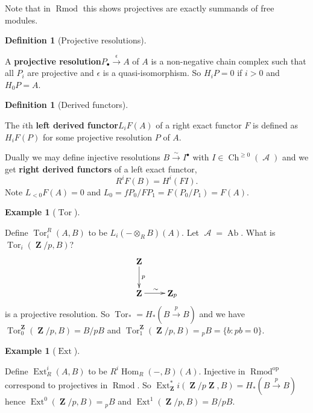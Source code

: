 \documentclass[10pt,]{book}
\newcommand{\lt}{<}
\newcommand{\gt}{>}
\newcommand{\terminology}[1]{\textbf{#1}}
\theoremstyle{plain}
\theoremstyle{definition}
\newtheorem{definition}[theorem]{Definition}
\newtheorem{example}[theorem]{Example}
\numberwithin{equation}{section}
\DeclareMathOperator{\Hom}{Hom}
\DeclareMathOperator{\Tor}{Tor}
\DeclareMathOperator{\Ext}{Ext}
\DeclareMathOperator{\op}{op}
\DeclareMathOperator{\Ch}{Ch}
\DeclareMathOperator{\Ab}{\text{Ab}}
\DeclareMathOperator{\Rmod}{R\text{mod}}
\DeclareMathOperator{\cA}{\mathcal{A}}
\DeclareMathOperator{\ZZ}{\mathbf{Z}}
\begin{document}
\par

          Note that in \(\Rmod\) this shows projectives are exactly summands of free modules.
          
\begin{definition}[Projective resolutions]\label{definition-18}

            A \terminology{projective resolution}\(P_\bullet \xrightarrow{\epsilon} A\) of \(A\) is a non-negative chain complex such that all \(P_i\) are projective and \(\epsilon\) is a quasi-isomorphism.
            So \(H_i P = 0\) if \(i \gt 0\) and \(H_0 P = A\).
          \end{definition}
\begin{definition}[Derived functors]\label{definition-19}

            The \(i\)th \terminology{left derived functor}\(L_i F(A)\) of a right exact functor \(F\) is defined as \(H_iF(P)\) for some projective resolution \(P\) of \(A\).\newline{}\end{definition}
\par

          Dually we may define injective resolutions \(B \xrightarrow{\sim} I^\bullet\) with \(I \in \Ch^{\ge 0}(\cA)\) and we get \terminology{right derived functors} of a left exact functor,
          \[
            R^i F(B) = H^i (FI ).
          \]
          Note \(L_{\lt 0} F(A) = 0\) and \(L_0= fP_0 / FP_1 = F(P_0/P_1) = F(A)\).
\begin{example}[\(\Tor\)]\label{example-10}

            Define \(\Tor^R_i(A, B)\) to be \(L_i(- \otimes_R B)(A)\).
            Let \(\cA = \Ab\). What is \(\Tor_i(\ZZ/p , B)\)?
            \[
              \xymatrix{\ZZ\ar[d]^p &\\ \ZZ \ar[r]^{\sim} &\ZZ_p}
            \]
            is a projective resolution.
            So \(\Tor_* = H_*(B \xrightarrow{p} B)\) and we have \(\Tor^{\ZZ}_0 (\ZZ/p, B) = B/pB\) and \(\Tor^{\ZZ}_1(\ZZ/p, B) = {}_pB = \{b : pb = 0\}\).
          \end{example}
\begin{example}[\(\Ext\)]\label{example-11}

            Define \(\Ext^i_R(A, B)\) to be \(R^i\Hom_R(-, B)(A)\).
            Injective in \(\Rmod^{\op}\) correspond to projectives in \(\Rmod\).
            So \(\Ext_{\ZZ}^*i(\ZZ/p\ZZ, B) = H_*(B \xrightarrow{p} B)\) hence \(\Ext^0 (\ZZ/p, B) = {}_pB\) and \(\Ext^1(\ZZ/p, B) = B/pB\).
          \end{example}
\typeout{************************************************}
\typeout{************************************************}
\end{document}
